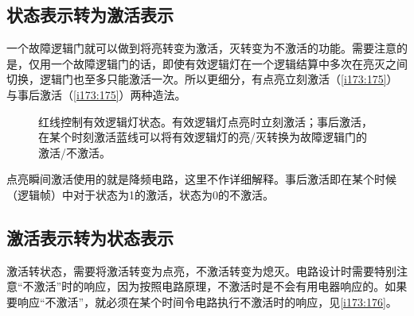 \subsection{状态表示转为激活表示}

一个故障逻辑门就可以做到将亮转变为激活，灭转变为不激活的功能。需要注意的是，仅用一个故障逻辑门的话，即使有效逻辑灯在一个逻辑结算中多次在亮灭之间切换，逻辑门也至多只能激活一次。所以更细分，有点亮立刻激活（\autoref{i173:175}）与事后激活（\autoref{i173:175}）两种造法。

\begin{figure}[!ht]
\begin{center}
\qquad
{}
\qquad
{}
\end{center}
\caption{红线控制有效逻辑灯状态。\protect{}有效逻辑灯点亮时立刻激活；\protect{}事后激活，在某个时刻激活蓝线可以将有效逻辑灯的亮/灭转换为故障逻辑门的激活/不激活。}
\label{i173:175}
\end{figure}

点亮瞬间激活使用的就是降频电路，这里不作详细解释。事后激活即在某个时候（逻辑帧）中对于状态为1的激活，状态为0的不激活。

\subsection{激活表示转为状态表示}

激活转状态，需要将激活转变为点亮，不激活转变为熄灭。电路设计时需要特别注意“不激活”时的响应，因为按照电路原理，不激活时是不会有用电器响应的。如果要响应“不激活”，就必须在某个时间令电路执行不激活时的响应，见\autoref{i173:176}。

